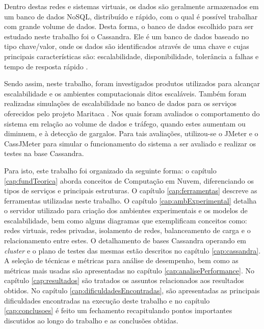 Dentro destas redes e sistemas virtuais, os dados são geralmente armazenados em um banco de dados NoSQL, distribuído e rápido, com o qual é possível trabalhar com grande volume de dados. Desta forma, o banco de dados escolhido para ser estudado neste trabalho foi o Cassandra. Ele é um banco de dados baseado no tipo chave/valor, onde os dados são identificados através de uma chave e cujas principais características são: escalabilidade, disponibilidade, tolerância a falhas e tempo de resposta rápido \cite{Silva}.

Sendo assim, neste trabalho, foram investigados produtos utilizados para alcançar escalabilidade e os ambientes computacionais ditos escaláveis. Também foram realizadas simulações de escalabilidade no banco de dados para os serviços oferecidos pelo projeto Maritaca \cite{maritaca}. Nos quais foram avaliados o comportamento do sistema em relação ao volume de dados e tráfego, quando estes aumentam ou diminuem, e à detecção de gargalos. Para tais avaliações, utilizou-se o JMeter e o CassJMeter para simular o funcionamento do sistema a ser avaliado e realizar os testes na base Cassandra.

Para isto, este trabalho foi organizado da seguinte forma: o capítulo \ref{cap:fundTeorica} aborda conceitos de Computação em Nuvem, diferenciando os tipos de serviços e principais estruturas. O capítulo \ref{cap:ferramentas} descreve as ferramentas utilizadas neste trabalho. O capítulo \ref{cap:ambExperimental} detalha o servidor utilizado para criação dos ambientes experimentais e os modelos de escalabilidade, bem como alguns diagramas que exemplificam conceitos como: redes virtuais, redes privadas, isolamento de redes, balanceamento de carga e o relacionamento entre estes. O detalhamento de bases Cassandra operando em \textit{cluster} e o plano de testes das mesmas estão descritos no capítulo \ref{cap:cassandra}. A seleção de técnicas e métricas para análise de desempenho, bem como as métricas mais usadas são apresentadas no capítulo \ref{cap:analisePerformance}. No capítulo \ref{cap:resultados} são tratados os assuntos relacionados aos resultados obtidos. No capítulo \ref{cap:dificuldadesEncontradas}, são apresentadas as principais dificuldades encontradas na execução deste trabalho e no capítulo \ref{cap:conclusoes} é feito um fechamento recapitulando pontos importantes discutidos ao longo do trabalho e as conclusões obtidas.